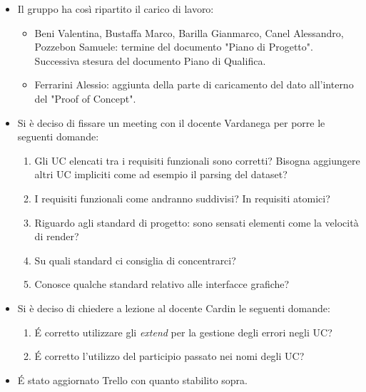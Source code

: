 \begin{itemize}
	\item Il gruppo ha così ripartito il carico di lavoro:
	\begin{itemize}
		\item Beni Valentina, Bustaffa Marco, Barilla Gianmarco, Canel Alessandro, Pozzebon Samuele: termine del documento "Piano di Progetto". Successiva stesura del documento Piano di Qualifica. 
		\item Ferrarini Alessio: aggiunta della parte di caricamento del dato all'interno del "Proof of Concept".
	\end{itemize}
	\item Si è deciso di fissare un meeting con il docente Vardanega per porre le seguenti domande:
	\begin{enumerate}
		\item Gli UC elencati tra i requisiti funzionali sono corretti? Bisogna aggiungere altri UC impliciti come ad esempio il parsing del dataset?
		\item I requisiti funzionali come andranno suddivisi? In requisiti atomici?
		\item Riguardo agli standard di progetto: sono sensati elementi come la velocità di render?
		\item Su quali standard ci consiglia di concentrarci?
		\item Conosce qualche standard relativo alle interfacce grafiche?
	\end{enumerate}
	\item Si è deciso di chiedere a lezione al docente Cardin le seguenti domande:
	\begin{enumerate}
		\item \' E corretto utilizzare gli \textit{extend} per la gestione degli errori negli UC?
		\item \' E corretto l'utilizzo del participio passato nei nomi degli UC?
	\end{enumerate}
	\item \' E stato aggiornato Trello con quanto stabilito sopra.
\end{itemize}